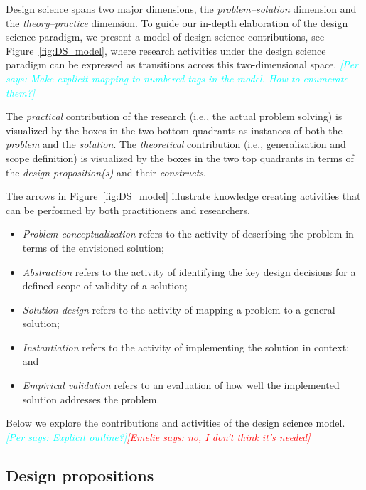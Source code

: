 \documentclass[graybox]{svmult}
\newcommand{\emelie}[1]{\textcolor{red}{{\it [Emelie says: #1]}}}
\newcommand{\per}[1]{\textcolor{cyan}{{\it [Per says: #1]}}}
\newcommand{\emelie}[1]{}
\newcommand{\per}[1]{}
\begin{document}
Design science spans two major dimensions, the \emph{problem--solution} dimension and the \emph{theory--practice} dimension. To guide our in-depth elaboration of the design science paradigm, we present a model of design science contributions, see Figure~\ref{fig:DS_model}, where research activities under the design science paradigm can be expressed as transitions across this two-dimensional space.
\per{Make explicit mapping to numbered tags in the model. How to enumerate them?}

The \emph{practical} contribution of the research (i.e., the actual problem solving) is visualized by the boxes in the two bottom quadrants as instances of both the \emph{problem} and the \emph{solution}. The \emph{theoretical} contribution (i.e., generalization and scope definition) is visualized by the boxes in the two top quadrants in terms of the \emph{design proposition(s)} and their \emph{constructs}. 

The arrows in Figure~\ref{fig:DS_model} illustrate knowledge creating activities that can be performed by both practitioners and researchers. 
\begin{itemize}
\item \emph{Problem conceptualization} refers to the activity of describing the problem in terms of the envisioned solution; 
\item \emph{Abstraction} refers to the activity of identifying the key design decisions for a defined scope of validity of a solution; 
\item \emph{Solution design} refers to the activity of mapping a problem to a general solution; 
\item \emph{Instantiation} refers to the activity of implementing the solution in context; and 
\item \emph{Empirical validation} refers to an evaluation of how well the implemented solution addresses the problem.
\end{itemize}

Below we explore the contributions and activities of the design science model. \per{Explicit outline?}\emelie{no, I don't think it's needed}

\subsection{Design propositions}
\label{sec:technologicalrules}
\end{document}
